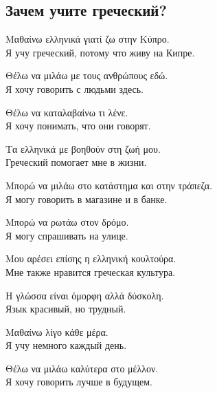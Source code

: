 \documentclass[12pt]{article}
\newcommand{\my}[1]{\textcolor{gray!80!white}{#1}}
\newenvironment{page}{\clearpage\normalsize\null\vfill}{\vfill\null}
\newenvironment{textblock}{\begin{minipage}{\textwidth}}{\end{minipage}\smallskip}
\begin{document}
	\begin{page}
		\subsection{Зачем учите греческий?}
		\small
		\begin{textblock}
			Μαθαίνω ελληνικά γιατί ζω στην Κύπρο.\\
			\my{Я учу греческий, потому что живу на Кипре.}
			
			Θέλω να μιλάω με τους ανθρώπους εδώ.\\
			\my{Я хочу говорить с людьми здесь.}
			
			Θέλω να καταλαβαίνω τι λένε.\\
			\my{Я хочу понимать, что они говорят.}
			
			Τα ελληνικά με βοηθούν στη ζωή μου.\\
			\my{Греческий помогает мне в жизни.}
			
			Μπορώ να μιλάω στο κατάστημα και στην τράπεζα.\\
			\my{Я могу говорить в магазине и в банке.}
			
			Μπορώ να ρωτάω στον δρόμο.\\
			\my{Я могу спрашивать на улице.}
			
			Μου αρέσει επίσης η ελληνική κουλτούρα.\\
			\my{Мне также нравится греческая культура.}
			
			Η γλώσσα είναι όμορφη αλλά δύσκολη.\\
			\my{Язык красивый, но трудный.}
			
			Μαθαίνω λίγο κάθε μέρα.\\
			\my{Я учу немного каждый день.}
			
			Θέλω να μιλάω καλύτερα στο μέλλον.\\
			\my{Я хочу говорить лучше в будущем.}
		\end{textblock}
	\end{page}
	
\end{document}
